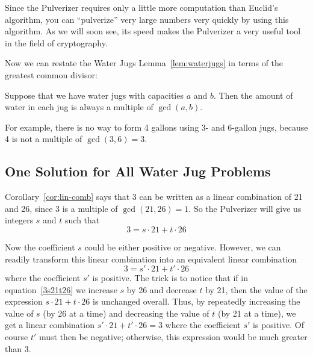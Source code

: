 Since the Pulverizer requires only a little more computation than Euclid's algorithm, you
can ``pulverize'' very large numbers very quickly by using this algorithm.  As we will soon
see, its speed makes the Pulverizer a very useful tool in the field of cryptography.

Now we can restate the Water Jugs Lemma~\ref{lem:waterjugs} in terms of the greatest common
divisor:
\begin{corollary}\label{cor:waterjugs}
Suppose that we have water jugs with capacities $a$ and $b$.  Then the amount of water in
each jug is always a multiple of $\gcd(a, b)$.
\end{corollary}
For example, there is no way to form 4 gallons using 3- and 6-gallon jugs, because 4 is not
a multiple of $\gcd(3, 6) = 3$.

\subsection{One Solution for All Water Jug Problems}\label{all_jugs_son_sec}

Corollary~\ref{cor:lin-comb} says that 3 can be written as a linear combination of 21 and
26, since 3 is a multiple of $\gcd(21, 26) = 1$.  So the Pulverizer will give us integers
$s$ and $t$ such that
\begin{equation}\label{3s21t26}
3 = s \cdot 21 + t \cdot 26
\end{equation}

Now the coefficient $s$ could be either positive or negative.  However, we can readily
transform this linear combination into an equivalent linear combination
\begin{equation}\label{3sprime21}
3 = s' \cdot 21 + t' \cdot 26
\end{equation}
where the coefficient $s'$ is positive.  The trick is to notice that if in
equation~\eqref{3s21t26} we increase $s$ by 26 and decrease $t$ by 21, then the value of
the expression $s \cdot 21 + t \cdot 26$ is unchanged overall.  Thus, by repeatedly
increasing the value of $s$ (by 26 at a time) and decreasing the value of $t$ (by 21 at a
time), we get a linear combination $s' \cdot 21 + t' \cdot 26 = 3$ where the coefficient
$s'$ is positive.  Of course $t'$ must then be negative; otherwise, this expression would
be much greater than 3.

